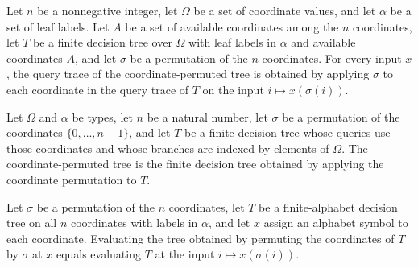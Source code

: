 \begin{theorem}
\label{FABL.FiniteDecisionTree.queryTrace_permuteCoordinatesAux}
\leanok
{}
Let $n$ be a nonnegative integer, let $\Omega$ be a set of coordinate values, and let
$\alpha$ be a set of leaf labels. Let $A$ be a set of available coordinates among the
$n$ coordinates, let $T$ be a finite decision tree over $\Omega$ with leaf labels in
$\alpha$ and available coordinates $A$, and let $\sigma$ be a permutation of the $n$
coordinates. For every input $x$, the query trace of the coordinate-permuted tree is
obtained by applying $\sigma$ to each coordinate in the query trace of $T$ on the input
$i\mapsto x(\sigma(i))$.
\end{theorem}

\begin{definition}
\label{FABL.FiniteDecisionTree.permuteCoordinates}
\leanok
{}
Let $\Omega$ and $\alpha$ be types, let $n$ be a natural number, let $\sigma$ be a
permutation of the coordinates $\{0,\ldots,n-1\}$, and let $T$ be a finite decision tree
whose queries use those coordinates and whose branches are indexed by elements of
$\Omega$. The coordinate-permuted tree is the finite decision tree obtained by applying
the coordinate permutation to $T$.
\end{definition}

\begin{theorem}
\label{FABL.FiniteDecisionTree.eval_permuteCoordinates}
\leanok
{}
Let $\sigma$ be a permutation of the $n$ coordinates, let $T$ be a finite-alphabet
decision tree on all $n$ coordinates with labels in $\alpha$, and let $x$ assign an
alphabet symbol to each coordinate. Evaluating the tree obtained by permuting the
coordinates of $T$ by $\sigma$ at $x$ equals evaluating $T$ at the input $i\mapsto
x(\sigma(i))$.
\end{theorem}

